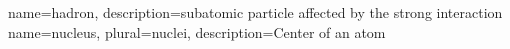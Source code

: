  {name=hadron, description={subatomic particle affected by the strong interaction}}
 {name=nucleus, plural=nuclei, description={Center of an atom}}